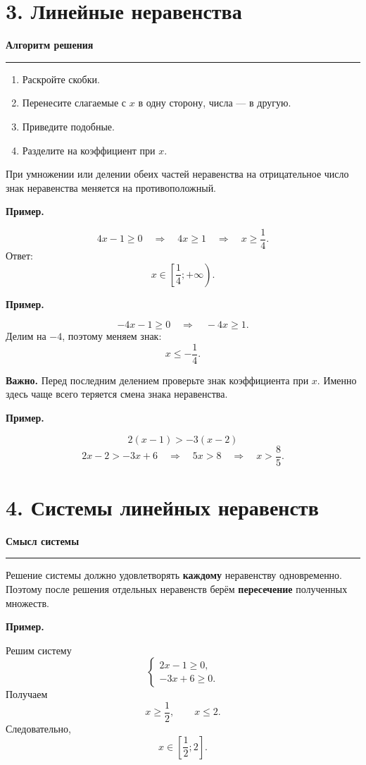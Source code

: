 \documentclass[a4paper,12pt]{article}
\newcommand{\keyidea}[1]{%
  \par\medskip
  {\bfseries\color{darkaccent}#1}\par
  \vspace{1pt}
  {\color{accent}\rule{\linewidth}{0.55pt}}\par
  \vspace{2pt}
}
\newcommand{\important}[1]{%
  \par\smallskip
  \noindent\textbf{\color{darkaccent}Важно.} #1\par
}
\newcommand{\exampletitle}{%
  \par\smallskip
  \noindent\textbf{\color{accent}Пример.}\enspace
}
\begin{document}
\clearpage

\section{3. Линейные неравенства}

\keyidea{Алгоритм решения}
\begin{enumerate}[leftmargin=8mm,itemsep=1mm,topsep=2mm]
  \item Раскройте скобки.
  \item Перенесите слагаемые с \(x\) в одну сторону, числа --- в другую.
  \item Приведите подобные.
  \item Разделите на коэффициент при \(x\).
\end{enumerate}

При умножении или делении обеих частей неравенства на отрицательное число знак неравенства меняется на противоположный.

\exampletitle
\[
4x-1\ge0
\quad\Longrightarrow\quad
4x\ge1
\quad\Longrightarrow\quad
x\ge\frac14.
\]
Ответ:
\[
x\in\left[\frac14;+\infty\right).
\]

\exampletitle
\[
-4x-1\ge0
\quad\Longrightarrow\quad
-4x\ge1.
\]
Делим на \(-4\), поэтому меняем знак:
\[
x\le-\frac14.
\]

\important{Перед последним делением проверьте знак коэффициента при \(x\). Именно здесь чаще всего теряется смена знака неравенства.}

\exampletitle
\[
2(x-1)>-3(x-2)
\]
\[
2x-2>-3x+6
\quad\Longrightarrow\quad
5x>8
\quad\Longrightarrow\quad
x>\frac85.
\]

\section{4. Системы линейных неравенств}

\keyidea{Смысл системы}
Решение системы должно удовлетворять \textbf{каждому} неравенству одновременно. Поэтому после решения отдельных неравенств берём \textbf{пересечение} полученных множеств.

\exampletitle
Решим систему
\[
\begin{cases}
2x-1\ge0,\\
-3x+6\ge0.
\end{cases}
\]
Получаем
\[
x\ge\frac12,
\qquad
x\le2.
\]
Следовательно,
\[
x\in\left[\frac12;2\right].
\]
\end{document}

